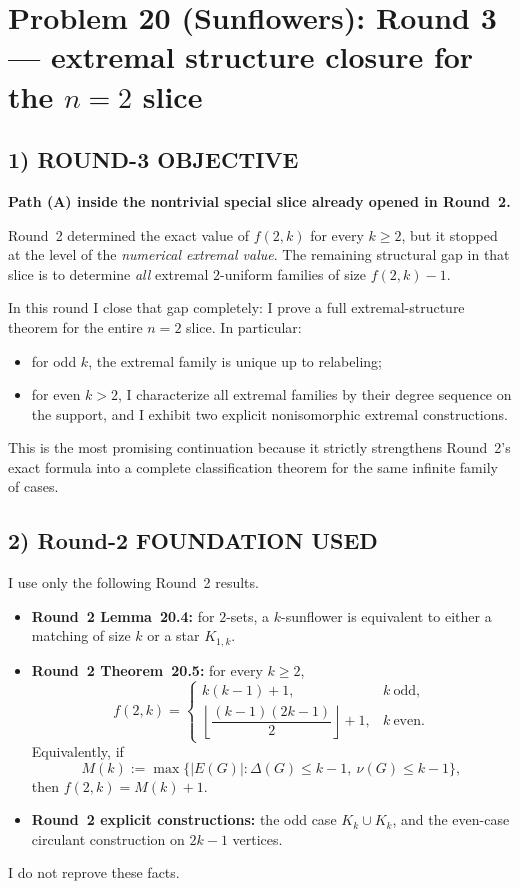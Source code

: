 \section{Problem 20 (Sunflowers): Round 3 --- extremal structure closure for the $n=2$ slice}

\subsection{1) ROUND-3 OBJECTIVE}
\textbf{Path (A) inside the nontrivial special slice already opened in Round~2.}

Round~2 determined the exact value of $f(2,k)$ for every $k\ge 2$, but it stopped at the level of the \emph{numerical extremal value}. The remaining structural gap in that slice is to determine \emph{all} extremal $2$-uniform families of size $f(2,k)-1$.

In this round I close that gap completely: I prove a full extremal-structure theorem for the entire $n=2$ slice. In particular:
\begin{itemize}
\item for odd $k$, the extremal family is unique up to relabeling;
\item for even $k>2$, I characterize all extremal families by their degree sequence on the support, and I exhibit two explicit nonisomorphic extremal constructions.
\end{itemize}
This is the most promising continuation because it strictly strengthens Round~2's exact formula into a complete classification theorem for the same infinite family of cases.

\subsection{2) Round-2 FOUNDATION USED}
I use only the following Round~2 results.
\begin{itemize}
\item \textbf{Round~2 Lemma~20.4:} for $2$-sets, a $k$-sunflower is equivalent to either a matching of size $k$ or a star $K_{1,k}$.
\item \textbf{Round~2 Theorem~20.5:} for every $k\ge 2$,
\[
 f(2,k)=
 \begin{cases}
  k(k-1)+1, & k\ \text{odd},\\[3pt]
  \left\lfloor \dfrac{(k-1)(2k-1)}{2}\right\rfloor+1, & k\ \text{even}.
 \end{cases}
\]
Equivalently, if
\[
M(k):=\max\{|E(G)|:\Delta(G)\le k-1,\ \nu(G)\le k-1\},
\]
then $f(2,k)=M(k)+1$.
\item \textbf{Round~2 explicit constructions:} the odd case $K_k\cup K_k$, and the even-case circulant construction on $2k-1$ vertices.
\end{itemize}
I do not reprove these facts.

